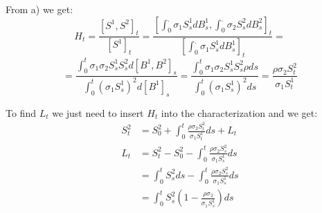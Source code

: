 \documentclass[document.tex]{subfiles}
\begin{document}
From a) we get:
\begin{equation}
H_t = \frac{[S^1, S^2]_t}{[S^1]_t} = \frac{[\int_0^. \sigma_1 S_s^1 d B^1_s, \int_0^. \sigma_2 S_s^2 d B^2_s]_t}{[\int_0^. \sigma_1 S_s^1 d B^1_s]_t} = 
\end{equation}
\begin{equation}
 = \frac{\int_0^t \sigma_1 \sigma_2 S_s^1 S_s^2 d [B^1, B^2]_s}{\int_0^t (\sigma_1 S_s^1)^2 d [B^1]_s} = \frac{\int_0^t \sigma_1 \sigma_2 S_s^1 S_s^2 \rho d s}{\int_0^t (\sigma_1 S_s^1)^2 d s} = \frac{ \rho \sigma_2 S_t^2}{\sigma_1 S_t^1}
\end{equation}

To find $L_t$ we just need to insert $H_t$ into the characterization and we get:
\begin{align*}
S^2_t &=  S_0^2 + \int_0^t \frac{ \rho \sigma_2 S_t^2}{\sigma_1 S_t^1} d s + L_t \\
L_t &= S^2_t - S_0^2 - \int_0^t \frac{ \rho \sigma_2 S_s^2}{\sigma_1 S_s^1} d s \\
 &= \int_0^t S^2_s d s - \int_0^t \frac{ \rho \sigma_2 S_s^2}{\sigma_1 S_s^1} d s\\
 &= \int_0^t S^2_s (1 - \frac{ \rho \sigma_2}{\sigma_1 S_s^1}) d s
\end{align*}
\end{document}
